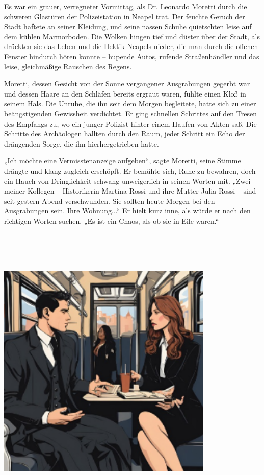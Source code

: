 \documentclass[
]{article}
\begin{document}
Es war ein grauer, verregneter Vormittag, als Dr. Leonardo Moretti durch
die schweren Glastüren der Polizeistation in Neapel trat. Der feuchte
Geruch der Stadt haftete an seiner Kleidung, und seine nassen Schuhe
quietschten leise auf dem kühlen Marmorboden. Die Wolken hingen tief und
düster über der Stadt, als drückten sie das Leben und die Hektik Neapels
nieder, die man durch die offenen Fenster hindurch hören konnte --
hupende Autos, rufende Straßenhändler und das leise, gleichmäßige
Rauschen des Regens.

Moretti, dessen Gesicht von der Sonne vergangener Ausgrabungen gegerbt
war und dessen Haare an den Schläfen bereits ergraut waren, fühlte einen
Kloß in seinem Hals. Die Unruhe, die ihn seit dem Morgen begleitete,
hatte sich zu einer beängstigenden Gewissheit verdichtet. Er ging
schnellen Schrittes auf den Tresen des Empfangs zu, wo ein junger
Polizist hinter einem Haufen von Akten saß. Die Schritte des Archäologen
hallten durch den Raum, jeder Schritt ein Echo der drängenden Sorge, die
ihn hierhergetrieben hatte.

„Ich möchte eine Vermisstenanzeige aufgeben``, sagte Moretti, seine
Stimme drängte und klang zugleich erschöpft. Er bemühte sich, Ruhe zu
bewahren, doch ein Hauch von Dringlichkeit schwang unweigerlich in
seinen Worten mit. „Zwei meiner Kollegen -- Historikerin Martina Rossi
und ihre Mutter Julia Rossi -- sind seit gestern Abend verschwunden. Sie
sollten heute Morgen bei den Ausgrabungen sein. Ihre Wohnung...`` Er
hielt kurz inne, als würde er nach den richtigen Worten suchen. „Es ist
ein Chaos, als ob sie in Eile waren.``

\includegraphics[width=4.0625in,height=5.61458in]{media/image3.png}
\end{document}
